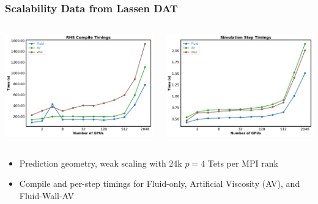 \begin{frame}\frametitle{Scalability Data from Lassen DAT}
    \begin{columns}[T]  %

    \begin{column}{0.5\textwidth}
    \centering
    \includegraphics[width=\textwidth]{Figures/mtc/RHSCompileTimes_2048.pdf}
    \end{column}
    
    \begin{column}{0.5\textwidth}
    \centering
      \includegraphics[width=\textwidth]{Figures/mtc/SimulationStepTimes_2048.pdf}
    \end{column}

  \end{columns}
  \begin{center}
  \begin{itemize}
  \item Prediction geometry, weak scaling with 24k $p=4$ Tets per MPI rank
  \item Compile and per-step timings for Fluid-only, Artificial Viscosity (AV), and Fluid-Wall-AV 
  \end{itemize}
  \end{center}
\end{frame}

